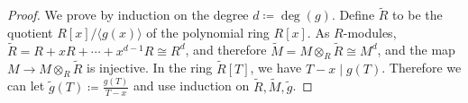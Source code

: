 \documentclass[10pt,a4paper]{amsart}
\begin{document}
\begin{proof}
    We prove by induction on the degree $d \coloneqq \deg(g)$. 
    Define $\widetilde R$ to be the quotient $R[x]/\langle g(x)\rangle$ of the polynomial ring $R[x]$. 
    As $R$-modules, $\widetilde R = R + xR + \cdots + x^{d-1}R \cong R^d$, and therefore $\widetilde M =M\otimes_R \widetilde R \cong M^d$, and the map $M\rightarrow M\otimes _R \widetilde R$ is injective. 
    In the ring $\widetilde R[T]$, we have $T - x \mid g(T)$.
    Therefore we can let $\widetilde g(T) \coloneqq \frac{g(T)}{T-x}$ and use induction on $\widetilde R, \widetilde M, \widetilde g$. 
\end{proof}
\end{document}
